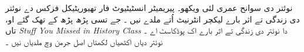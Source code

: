 \documentclass[../../../include/open-logic-section]{subfiles}
\begin{document}
\begin{reading}
نوئتر دی سوانح عمری لئی \citet{Dick1981} ویکھو۔ پیریمیٹر انسٹیٹیوٹ فار تھیوریٹیکل فزکس دے نوئتر دی زندگی تے اثر بارے لیکچر انٹرنیٹ اُتے ملدے نیں \citep{Perimeter2015}۔ جے تسی پڑھ پڑھ کے تھک گئے او، تاں \emph{Stuff You Missed in History Class} دا نوئتر دی زندگی تے اثر بارے اک پوڈکاسٹ اے \citep{Frey2015}۔ نوئتر دیاں اکٹھیاں لکھتاں اصل جرمن وچ ملدیاں نیں \citep{Noether1983}۔
\end{reading}
\end{document}
